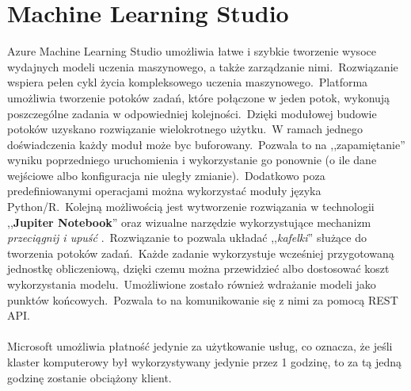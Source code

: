 \section{Machine Learning Studio}
Azure Machine Learning Studio umożliwia łatwe i szybkie tworzenie wysoce wydajnych modeli uczenia maszynowego, a także zarządzanie nimi.\ Rozwiązanie wspiera pełen cykl życia kompleksowego uczenia maszynowego.\ Platforma umożliwia tworzenie potoków zadań, które połączone w jeden potok, wykonują poszczególne zadania w odpowiedniej kolejności.\ Dzięki modułowej budowie potoków uzyskano rozwiązanie wielokrotnego użytku.\ W ramach jednego doświadczenia każdy moduł może byc buforowany.\ Pozwala to na ,,zapamiętanie'' wyniku poprzedniego uruchomienia i wykorzystanie go ponownie (o ile dane wejściowe albo konfiguracja nie uległy zmianie).\ Dodatkowo poza predefiniowanymi operacjami można wykorzystać moduły języka Python/R.\ Kolejną możliwością jest wytworzenie rozwiązania w technologii ,,\textbf{Jupiter Notebook}'' oraz wizualne narzędzie wykorzystujące mechanizm \textit{przeciągnij i upuść} .\ Rozwiązanie to pozwala układać ,,\textit{kafelki}'' służące do tworzenia potoków zadań.\ Każde zadanie wykorzystuje wcześniej przygotowaną jednostkę obliczeniową, dzięki czemu można przewidzieć albo dostosować koszt wykorzystania modelu.\ Umożliwione zostało również wdrażanie modeli jako punktów końcowych.\ Pozwala to na komunikowanie się z nimi za pomocą REST API.\\ \\

Microsoft umożliwia płatność jedynie za użytkowanie usług, co oznacza, że jeśli klaster komputerowy był wykorzystywany jedynie przez 1 godzinę, to za tą jedną godzinę zostanie obciążony klient\cite{MicrosoftAzuref}.